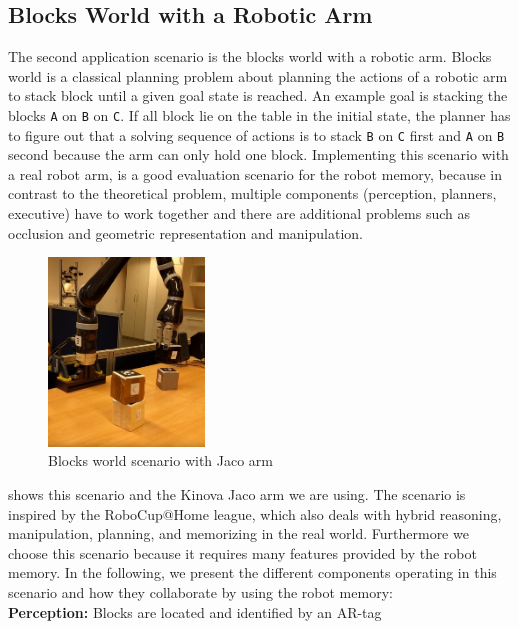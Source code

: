 \subsection{Blocks World with a Robotic Arm}
\label{sec:app-blocks-world}
The second application scenario is the blocks world with a robotic
arm. Blocks world is a classical planning problem about planning the
actions of a robotic arm to stack block until a given goal state is
reached. An example goal is stacking the blocks \texttt{A} on
\texttt{B} on \texttt{C}. If all block lie on the table in the initial
state, the planner has to figure out that a solving sequence of
actions is to stack \texttt{B} on \texttt{C} first and \texttt{A} on
\texttt{B} second because the arm can only hold one block.
Implementing this scenario with a real robot arm, is a good evaluation
scenario for the robot memory, because in contrast to the theoretical
problem, multiple components (perception, planners, executive)
have to work together and there are additional problems such as
occlusion and geometric representation and manipulation.
\begin{figure}
  \centering
  \includegraphics[width=0.37\textwidth]{img/blocks-world}%
  \caption[Blocks world scenario with Jaco arm]{Blocks world scenario with Jaco arm}
  \vspace{-4mm}
  \label{fig:blocksworld}
\end{figure}
 shows this scenario and the Kinova Jaco arm
we are using. The scenario is inspired by the RoboCup@Home league,
which also deals with hybrid reasoning, manipulation, planning, and
memorizing in the real world. Furthermore we choose this scenario
because it requires many features provided by the robot memory. In the
following, we present the different components operating in this
scenario and how they collaborate by using the robot memory:
\\
\textbf{Perception:} Blocks are located and identified by an AR-tag
